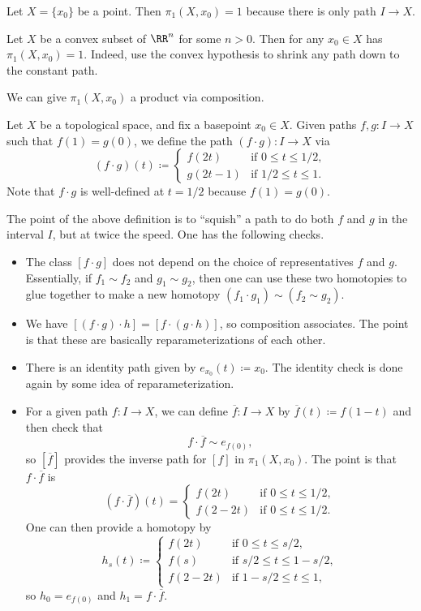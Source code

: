 \documentclass[../notes.tex]{subfiles}
\begin{document}
\begin{example}
	Let $X=\{x_0\}$ be a point. Then $\pi_1(X,x_0)=1$ because there is only path $I\to X$.
\end{example}
\begin{example}
	Let $X$ be a convex subset of $\RR^n$ for some $n>0$. Then for any $x_0\in X$ has $\pi_1(X,x_0)=1$. Indeed, use the convex hypothesis to shrink any path down to the constant path.
\end{example}
We can give $\pi_1(X,x_0)$ a product via composition.
\begin{definition}[composition]
	Let $X$ be a topological space, and fix a basepoint $x_0\in X$. Given paths $f,g\colon I\to X$ such that $f(1)=g(0)$, we define the path $(f\cdot g)\colon I\to X$ via
	\[(f\cdot g)(t)\coloneqq\begin{cases}
		f(2t) & \text{if }0\le t\le 1/2, \\
		g(2t-1) & \text{if }1/2\le t\le 1.
	\end{cases}\]
	Note that $f\cdot g$ is well-defined at $t=1/2$ because $f(1)=g(0)$.
\end{definition}
The point of the above definition is to ``squish'' a path to do both $f$ and $g$ in the interval $I$, but at twice the speed. One has the following checks.
\begin{itemize}
	\item The class $[f\cdot g]$ does not depend on the choice of representatives $f$ and $g$. Essentially, if $f_1\sim f_2$ and $g_1\sim g_2$, then one can use these two homotopies to glue together to make a new homotopy $(f_1\cdot g_1)\sim(f_2\sim g_2)$.
	\item We have $[(f\cdot g)\cdot h]=[f\cdot(g\cdot h)]$, so composition associates. The point is that these are basically reparameterizations of each other.
	\item There is an identity path given by $e_{x_0}(t)\coloneqq x_0$. The identity check is done again by some idea of reparameterization.
	\item For a given path $f\colon I\to X$, we can define $\overline f\colon I\to X$ by $\overline f(t)\coloneqq f(1-t)$ and then check that
	\[f\cdot\overline f\sim e_{f(0)},\]
	so $\left[\overline f\right]$ provides the inverse path for $[f]$ in $\pi_1(X,x_0)$. The point is that $f\cdot\overline f$ is
	\[\left(f\cdot\overline f\right)(t)=\begin{cases}
		f(2t) & \text{if }0\le t\le1/2, \\
		f(2-2t) & \text{if }0\le t\le 1/2.
	\end{cases}\]
	One can then provide a homotopy by
	\[h_s(t)\coloneqq\begin{cases}
		f(2t) & \text{if }0\le t\le s/2, \\
		f(s) & \text{if }s/2\le t\le 1-s/2, \\
		f(2-2t) & \text{if }1-s/2\le t\le 1,
	\end{cases}\]
	so $h_0=e_{f(0)}$ and $h_1=f\cdot\overline f$.
\end{itemize}
\end{document}
